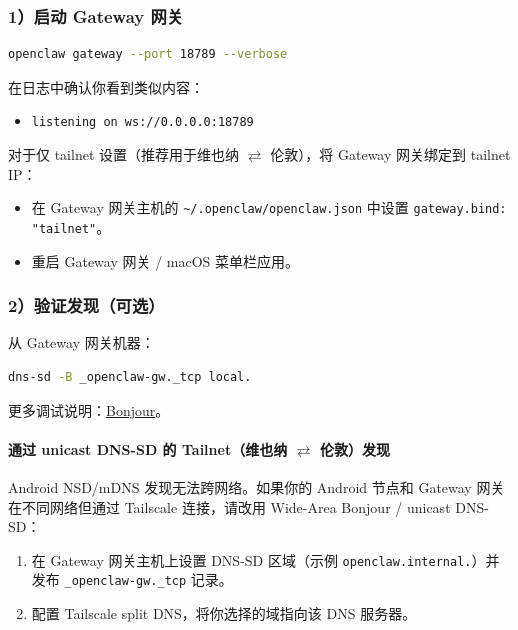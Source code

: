 \subsubsection{1）启动 Gateway 网关}


\begin{lstlisting}[language=bash]
openclaw gateway --port 18789 --verbose
\end{lstlisting}


在日志中确认你看到类似内容：

\begin{itemize}
  \item \texttt{listening on ws://0.0.0.0:18789}
\end{itemize}


对于仅 tailnet 设置（推荐用于维也纳 $\rightleftarrows$ 伦敦），将 Gateway 网关绑定到 tailnet IP：

\begin{itemize}
  \item 在 Gateway 网关主机的 \texttt{\textasciitilde{}/.openclaw/openclaw.json} 中设置 \texttt{gateway.bind: "tailnet"}。
  \item 重启 Gateway 网关 / macOS 菜单栏应用。
\end{itemize}


\subsubsection{2）验证发现（可选）}


从 Gateway 网关机器：

\begin{lstlisting}[language=bash]
dns-sd -B _openclaw-gw._tcp local.
\end{lstlisting}


更多调试说明：\href{/gateway/bonjour}{Bonjour}。

\paragraph{通过 unicast DNS-SD 的 Tailnet（维也纳 $\rightleftarrows$ 伦敦）发现}


Android NSD/mDNS 发现无法跨网络。如果你的 Android 节点和 Gateway 网关在不同网络但通过 Tailscale 连接，请改用 Wide-Area Bonjour / unicast DNS-SD：

\begin{enumerate}
  \item 在 Gateway 网关主机上设置 DNS-SD 区域（示例 \texttt{openclaw.internal.}）并发布 \texttt{\_openclaw-gw.\_tcp} 记录。
  \item 配置 Tailscale split DNS，将你选择的域指向该 DNS 服务器。
\end{enumerate}


